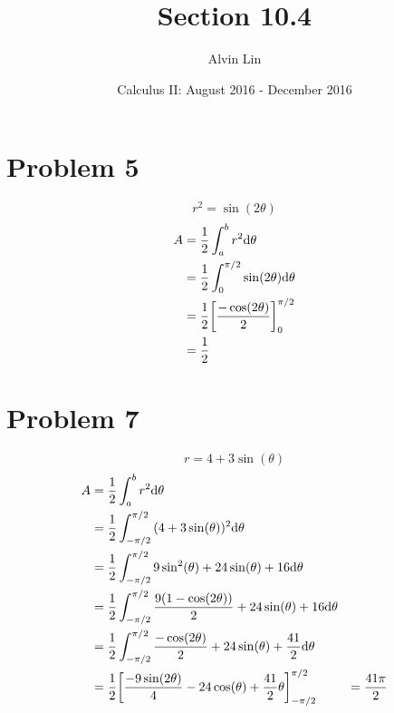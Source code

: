 \documentclass[letterpaper, 12pt]{math}
\title{Section 10.4}
\author{Alvin Lin}
\date{Calculus II: August 2016 - December 2016}
\begin{document}
\maketitle

\section*{Problem 5}
\[ r^{2} = \sin(2\theta) \]
\begin{align*}
  A &= \frac{1}{2}\int_{a}^{b}{r^{2}\mathrm{d}{\theta}} \\
  &= \frac{1}{2}\int_{0}^{\pi/2}{\sin(2\theta)\mathrm{d}{\theta}} \\
  &= \frac{1}{2}\bigg[\frac{-\cos(2\theta)}{2}\bigg]_{0}^{\pi/2} \\
  &= \frac{1}{2}
\end{align*}

\section*{Problem 7}
\[ r = 4+3\sin(\theta) \]
\begin{align*}
  A &= \frac{1}{2}\int_{a}^{b}{r^{2}\mathrm{d}{\theta}} \\
  &= \frac{1}{2}\int_{-\pi/2}^{\pi/2}{(4+3\sin(\theta))^{2}\mathrm{d}{\theta}} \\
  &= \frac{1}{2}\int_{-\pi/2}^{\pi/2}
    {9\sin^{2}(\theta)+24\sin(\theta)+16\mathrm{d}{\theta}} \\
  &= \frac{1}{2}\int_{-\pi/2}^{\pi/2}
    {\frac{9(1-\cos(2\theta))}{2}+24\sin(\theta)+16\mathrm{d}{\theta}} \\
  &= \frac{1}{2}\int_{-\pi/2}^{\pi/2}
    {\frac{-\cos(2\theta)}{2}+24\sin(\theta)+\frac{41}{2}\mathrm{d}{\theta}} \\
  &= \frac{1}{2}\bigg[
    \frac{-9\sin(2\theta)}{4}-24\cos(\theta)+
      \frac{41}{2}\theta\bigg]_{-\pi/2}^{\pi/2}
  &= \frac{41\pi}{2}
\end{align*}
\end{document}

